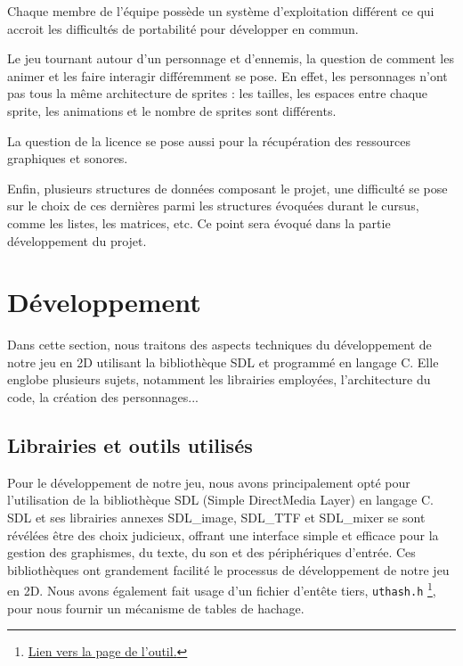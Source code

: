 \documentclass[a4paper,12pt]{article}
\begin{document}
Chaque membre de l’équipe possède un système d’exploitation différent ce qui accroit les difficultés de portabilité pour développer en commun.

Le jeu tournant autour d’un personnage et d’ennemis, la question de comment les animer et les faire interagir différemment se pose. 
En effet, les personnages n’ont pas tous la même architecture de sprites :  les tailles,  les espaces entre chaque sprite, les animations et le nombre de sprites sont différents.

La question de la licence se pose aussi pour la récupération des ressources graphiques et sonores.

Enfin, plusieurs structures de données composant le projet, une difficulté se pose sur le choix de ces dernières parmi les structures évoquées durant le cursus, comme les listes, les matrices, etc.
Ce point sera évoqué dans la partie développement du projet.


\section{Développement}

Dans cette section, nous traitons des aspects techniques du développement de notre jeu en 2D utilisant la bibliothèque SDL et programmé en langage C. Elle englobe plusieurs sujets, notamment les librairies employées, l'architecture du code, la création des personnages...

\subsection{Librairies et outils utilisés}

Pour le développement de notre jeu, nous avons principalement opté pour l'utilisation de la bibliothèque SDL (Simple DirectMedia Layer) en langage C.
SDL et ses librairies annexes SDL\_image, SDL\_TTF et SDL\_mixer se sont révélées être des choix judicieux, offrant une interface simple et efficace pour la gestion des graphismes, du texte, du son et des périphériques d'entrée.
Ces bibliothèques ont grandement facilité le processus de développement de notre jeu en 2D.
Nous avons également fait usage d’un fichier d’entête tiers, \texttt{uthash.h} \footnote{\href{https://troydhanson.github.io/uthash/userguide.html}{Lien vers la page de l’outil.}}, pour nous fournir un mécanisme de tables de hachage.
\end{document}
